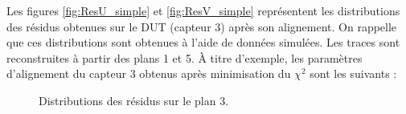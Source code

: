    \medskip
   
   Les figures \ref{fig:ResU_simple} et \ref{fig:ResV_simple} repr\'esentent les distributions des r\'esidus obtenues sur le DUT (capteur 3) après son alignement. On rappelle que ces distributions sont obtenues \`a l'aide de donn\'ees simul\'ees. Les traces sont reconstruites \`a partir des plans 1 et 5. \`A titre d'exemple, les param\`etres d'alignement du capteur 3 obtenus apr\`es minimisation du $\chi^2$ sont les suivants :

   \begin{figure}[htb!]
     \begin{center}
     \end{center}
     \caption{Distributions des r\'esidus sur le plan 3.}
     \label{fig:ResidualsUV_Pl3}
   \end{figure}
   
